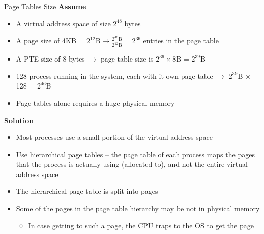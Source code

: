 \documentclass[aspectratio=169,12pt]{beamer}
\begin{document}
\begin{frame}{Page Tables Size}
\textbf{Assume}
\begin{itemize}
\item A virtual address space of size $2^{48}$ bytes
\item A page size of 4KB = $2^{12}\text{B} \rightarrow \frac{2^{48}\text{B}}{2^{12}\text{B}} = 2^{36}$ entries in the page table
\item A PTE size of 8 bytes $\rightarrow$ page table size is $2^{36} \times 8$B = $2^{39}$B
\item 128 process running in the system, each with it own page table $\rightarrow$ $2^{39}$B $\times$ 128 = $2^{46}$B
\item Page tables alone requires a huge physical memory
\end{itemize}

\textbf{Solution}
\begin{itemize}
\item Most processes use a small portion of the virtual address space
\item Use hierarchical page tables – the page table of each process maps the pages that the process is actually using (allocated to), and not the entire virtual address space
\item The hierarchical page table is split into pages
\item Some of the pages in the page table hierarchy may be not in physical memory
    \begin{itemize}
    \item In case getting to such a page, the CPU traps to the OS to get the page
    \end{itemize}
\end{itemize}
\end{frame}
\end{document}
